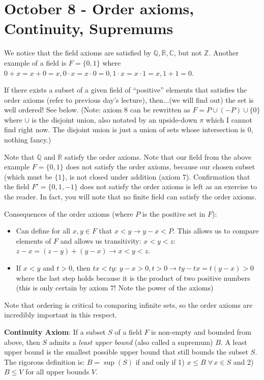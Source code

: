 \documentclass{report}
\begin{document}
\chapter{October 8 - Order axioms, Continuity, Supremums}

We notice that the field axioms are satisfied by $\mathbb{Q}, \mathbb{R}, \mathbb{C}$, but not $\mathbb{Z}$. Another example of a field is $F = \{0, 1\}$ where $0 + x = x + 0 = x, 0 \cdot x = x \cdot 0 = 0, 1 \cdot x = x \cdot 1 = x, 1 + 1 = 0$.

If there exists a subset of a given field of "`positive"' elements that satisfies the order axioms (refer to previous day's lecture), then...(we will find out) the set is well ordered! See below. (Note: axiom $8$ can be rewritten as $F = P \cup (-P) \cup \{0\}$ where $\cup$ is the disjoint union, also notated by an upside-down $\pi$ which I cannot find right now. The disjoint union is just a union of sets whose intersection is $0$, nothing fancy.)

Note that $\mathbb{Q}$ and $\mathbb{R}$ satisfy the order axioms. Note that our field from the above example $F = \{0,1\}$ does not satisfy the order axioms, because our chosen subset (which must be $\{1\}$, is not closed under addition (axiom $7$). Confirmation that the field $F' = \{ 0,1,-1\}$ does not satisfy the order axioms is left as an exercise to the reader. In fact, you will note that no finite field can satisfy the order axioms.

Consequences of the order axioms (where $P$ is the positive set in $F$):

\begin{itemize}
\item Can define for all $x,y \in F$ that $x < y \rightarrow y-x < P$. This allows us to compare elements of $F$ and allows us transitivity: $x < y < z$: $z - x = (z - y) + (y - x) \rightarrow x < y < z$.
\item If $x < y$ and $t > 0$, then $tx < ty$: $y - x > 0, t > 0 \rightarrow ty-tx = t(y-x) > 0$ where the last step holds because it is the product of two positive numbers (this is only certain by axiom $7$! Note the power of the axioms)
\end{itemize}

Note that ordering is critical to comparing infinite sets, so the order axioms are incredibly important in this respect.

\textbf{Continuity Axiom}: If a subset $S$ of a field $F$ is non-empty and bounded from above, then $S$ admits a \emph{least upper bound} (also called a supremum) $B$. A least upper bound is the smallest possible upper bound that still bounds the subset $S$. The rigorous definition is: $B = \sup(S)$ if and only if 1) $x \leq B \; \forall \, x \in S$ and 2) $B \leq V$ for all upper bounds $V$.
\end{document}
